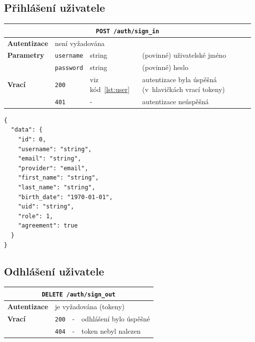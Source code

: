 \documentclass[twoside]{ctuthesis}
\begin{document}
\subsection{Přihlášení uživatele}
\label{sub:sign-in}
\begin{center}
	\begin{tabular}{p{.19\linewidth}p{.18\linewidth}p{.15\linewidth}p{.36\linewidth}}
		\hline
		\multicolumn{4}{c}{\texttt{POST /auth/sign\_in}}\\
		\hline
		\textbf{Autentizace}  & 	\multicolumn{3}{l}{není vyžadována}\\
		\textbf{Parametry} 		& \texttt{username} & string & (povinné) uživatelské jméno \\
											 		& \texttt{password} & string & (povinné) heslo\\
		\textbf{Vrací} 				& 	\texttt{200} & viz kód~\ref{lst:user} & autentizace byla úspěšná (v~hlavičkách vrací tokeny)\\
									 				& \texttt{401} & - & autentizace neúspěšná\\
		\hline
	\end{tabular}

\end{center}

\begin{lstlisting}[caption={Přihlášení}, label={lst:user}]
	{
  "data": {
    "id": 0,
    "username": "string",
    "email": "string",
    "provider": "email",
    "first_name": "string",
    "last_name": "string",
    "birth_date": "1970-01-01",
    "uid": "string",
    "role": 1,
    "agreement": true
  }
}
\end{lstlisting}
\subsection{Odhlášení uživatele}
\begin{center}
	\begin{tabular}{p{.19\linewidth}p{.18\linewidth}p{.15\linewidth}p{.35\linewidth}}
		\hline
		\multicolumn{4}{c}{\texttt{DELETE /auth/sign\_out}}\\
		\hline
		\textbf{Autentizace}  & 	\multicolumn{3}{l}{je vyžadována (tokeny)}\\
		\textbf{Vrací} 				& 	\texttt{200} & - & odhlášení bylo úspěšné\\
									 				& \texttt{404} & - & token nebyl nalezen\\
		\hline
	\end{tabular}
\end{center}
\end{document}
